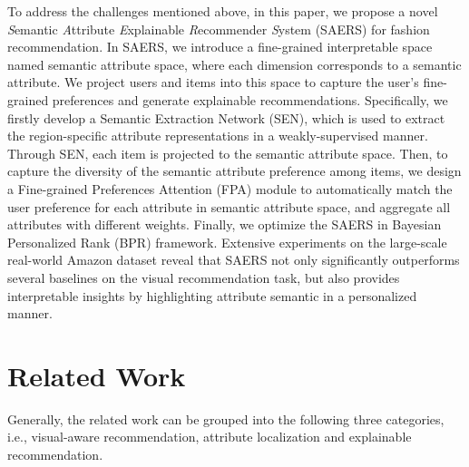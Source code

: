 \documentclass{article}
\begin{document}
To address the challenges mentioned above, in this paper, we propose
a novel \textit{S}emantic \textit{A}ttribute \textit{E}xplainable \textit{R}ecommender \textit{S}ystem (SAERS) for fashion recommendation. In SAERS, we introduce a fine-grained interpretable space named semantic attribute space, where each dimension corresponds to a semantic attribute. We project users and items into this space to capture the user's fine-grained preferences and generate explainable recommendations.
Specifically, we firstly develop a Semantic Extraction Network (SEN), which is used to extract the region-specific attribute representations in a weakly-supervised manner. Through SEN, each item is projected to the semantic attribute space. Then, to capture the diversity of the semantic attribute preference among items, we design a Fine-grained Preferences Attention (FPA) module to automatically match the user preference for each attribute in semantic attribute space, and aggregate all attributes with different weights. Finally, we optimize the SAERS in Bayesian Personalized Rank (BPR) framework. Extensive experiments on the large-scale real-world Amazon dataset reveal that SAERS not only significantly outperforms several baselines on the visual recommendation task, but also provides interpretable insights by highlighting attribute semantic in a personalized manner.



\section{Related Work}
Generally, the related work can be grouped into the following three categories, i.e., visual-aware recommendation, attribute localization and explainable recommendation.
\end{document}
